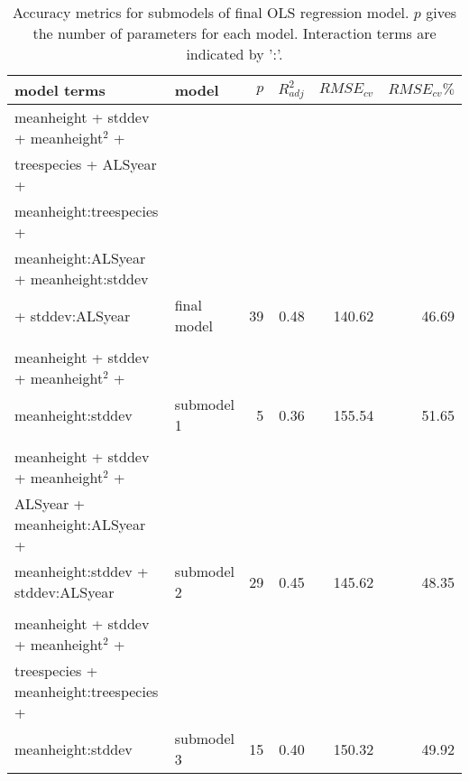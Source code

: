 \begin{table*}[!htbp]
	\centering
	\caption{Accuracy metrics for submodels of final OLS regression model. $p$ gives the number of parameters for each model. Interaction terms are indicated by ':'.} 
	\label{tab:modacc_modterms}
	\begin{tabular}{llrrrr}
  \hline
model terms & model & $p$ & $R^2_{adj}$ & $RMSE_{cv}$ & $RMSE_{cv}\%$ \\ 
  \hline
  meanheight + stddev + meanheight$^2$ + \\ treespecies + ALSyear + \\ meanheight:treespecies + \\ meanheight:ALSyear + meanheight:stddev \\ + stddev:ALSyear & final model &  39 & 0.48 & 140.62 & 46.69 \\ \\
  meanheight + stddev + meanheight$^2$ + \\ meanheight:stddev & submodel 1 &   5 & 0.36 & 155.54 & 51.65 \\ \\
  meanheight + stddev + meanheight$^2$ + \\ ALSyear + meanheight:ALSyear + \\ meanheight:stddev + stddev:ALSyear & submodel 2 &  29 & 0.45 & 145.62 & 48.35 \\ \\
  meanheight + stddev + meanheight$^2$ + \\ treespecies + meanheight:treespecies + \\ meanheight:stddev & submodel 3 &  15 & 0.40 & 150.32 & 49.92 \\ 
   \hline
\hline
\end{tabular}
\end{table*}


